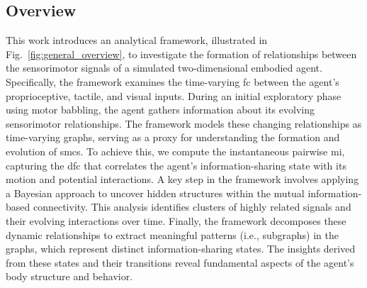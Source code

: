 \subsection{Overview}
This work introduces an analytical framework, illustrated in Fig.~\ref{fig:general_overview}, to investigate the formation of relationships between the sensorimotor signals of a simulated two-dimensional embodied agent. Specifically, the framework examines the time-varying \acl{fc} between the agent's proprioceptive, tactile, and visual inputs. During an initial exploratory phase using motor babbling, the agent gathers information about its evolving sensorimotor relationships. The framework models these changing relationships as time-varying graphs, serving as a proxy for understanding the formation and evolution of \acp{smc}. To achieve this, we compute the instantaneous pairwise \ac{mi}, capturing the \acl{dfc} that correlates the agent’s information-sharing state with its motion and potential interactions. A key step in the framework involves applying a Bayesian approach to uncover hidden structures within the mutual information-based connectivity. This analysis identifies clusters of highly related signals and their evolving interactions over time. Finally, the framework decomposes these dynamic relationships to extract meaningful patterns (i.e., subgraphs) in the graphs, which represent distinct information-sharing states. The insights derived from these states and their transitions reveal fundamental aspects of the agent’s body structure and behavior.
